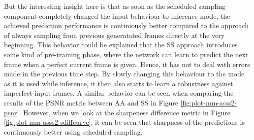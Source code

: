 But the interesting insight here is that as soon as the scheduled sampling component completely changed the input behaviour to inference mode, the achieved prediction performance is continiously better compared to the approach of always sampling from previous generatated frames directly at the very beginning. This behavior could be explained that the SS approach introduces some kind of pre-training phase, where the network can learn to predict the next frame when a perfect current frame is given. Hence, it has not to deal with errors made in the previous time step. By slowly changing this behaviour to the mode as it is used while inference, it then also starts to learn a robustness against imperfect input frames. A similar behavior can be seen when comparing the results of the PSNR metric between AA and SS in Figure \ref{fig:plot-mm-asss2-psnr}. However, when we look at the sharpeness difference metric in Figure \ref{fig:plot-mm-asss2-sdiffcurve}, it can be seen that sharpness of the predictions is continuously better using scheduled sampling.


